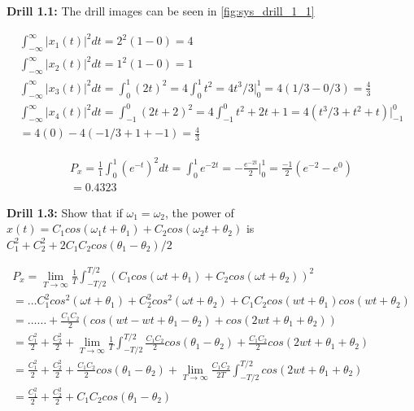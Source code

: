 \textbf{Drill 1.1: }
The drill images can be seen in \ref{fig:sys_drill_1_1}

\begin{gather}
    \int_{-\infty}^{\infty} |x_1(t)|^2 dt = 2^2 (1-0) = 4 \\
   \int_{-\infty}^{\infty} |x_2(t)|^2 dt =  1^2 (1-0) = 1 \\
   \int_{-\infty}^{\infty} |x_3(t)|^2 dt = \int_{0}^{1} (2t)^2 = 4 \int_{0}^{1} t^2 = 4 t^3/3 \Big|_0^1 = 4(1/3 - 0/3) = \frac{4}{3} \\
    \int_{-\infty}^{\infty} |x_4(t)|^2 dt = \int_{-1}^{0} (2t +2)^2 = 4\int_{-1}^0 t^2 + 2t + 1 = 4(t^3/3 + t^2 +t) \Big|_{-1}^0 \\
    = 4(0) -4(-1/3 + 1 + -1) = \frac{4}{3}
\end{gather}

\begin{gather}
    P_x = \frac{1}{1} \int_{0}^{1} (e^{-t})^2 dt = \int_{0}^{1} e^{-2t} = - \frac{e^{-2t}}{2} \Big|_{0}^1 = \frac{-1}{2}(e^{-2} - e^{0})
    \\ = 0.4323
\end{gather}

\textbf{Drill 1.3: }
Show that if $\omega_1 = \omega_2 $, the power of $x(t) = C_1 cos (\omega_1 t + \theta_1) + C_2 cos (\omega_2 t + \theta_2)$ is $C_1^2 + C_2^2 + 2C_1 C_2 cos (\theta_1 - \theta_2)/2$

\begin{gather}
   P_x = \lim_{T \to \infty} \frac{1}{T} \int_{-T/2}^{T/2} (C_1 cos (\omega t + \theta_1) + C_2 cos (\omega t + \theta_2) )^2 \\
   = \dots C_1^2 cos^2 (\omega t + \theta_1) + C_2^2 cos^2 (\omega t + \theta_2) + C_1 C_2 cos(wt + \theta_1) cos (wt + \theta_2) \\
   = \dots \dots + \frac{C_1 C_2}{2} (cos(wt -wt + \theta_1 - \theta_2) + cos (2wt + \theta_1 + \theta_2)) \\ 
   = \frac{C_1^2}{2} + \frac{C_2^2}{2} + \lim_{T \to \infty} \frac{1}{T} \int_{-T/2}^{T/2} \frac{C_1 C_2}{2} cos(\theta_1 - \theta_2) + \frac{C_1 C_2}{2} cos (2wt + \theta_1 + \theta_2) \\ 
   = \frac{C_1^2}{2} + \frac{C_2^2}{2} + \frac{C_1 C_2}{2} cos(\theta_1 - \theta_2) + \lim_{T \to \infty} \frac{C_1 C_2}{2T} \int_{-T/2}^{T/2}cos (2wt + \theta_1 + \theta_2) \\
   = \frac{C_1^2}{2} + \frac{C_2^2}{2} + C_1 C_2 cos(\theta_1 - \theta_2)
\end{gather}
